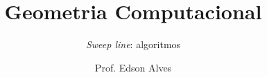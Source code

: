 \title{Geometria Computacional}
\subtitle{\textit{Sweep line}: algoritmos} 
\date{}
\author{Prof. Edson Alves}
